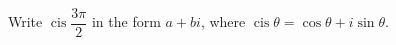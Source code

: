 Write $\operatorname{cis}\dfrac{3\pi}{2}$ in the form $a+bi$, where $\operatorname{cis}\theta=\cos\theta+i\sin\theta$.
